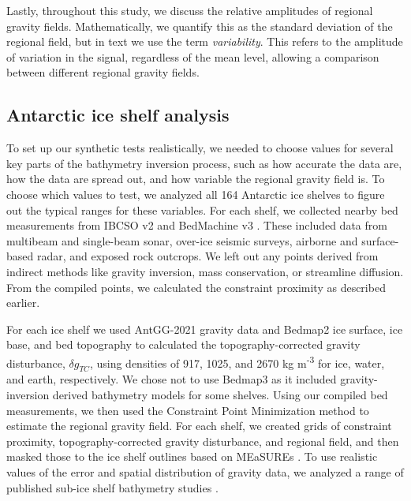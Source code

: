 \documentclass[tc, manuscript]{copernicus}
\begin{document}
Lastly, throughout this study, we discuss the relative amplitudes of regional gravity fields. Mathematically, we quantify this as the standard deviation of the regional field, but in text we use the term \textit{variability}. This refers to the amplitude of variation in the signal, regardless of the mean level, allowing a comparison between different regional gravity fields.

\subsection{Antarctic ice shelf analysis} \label{ice_shelf_analysis}

To set up our synthetic tests realistically, we needed to choose values for several key parts of the bathymetry inversion process, such as how accurate the data are, how the data are spread out, and how variable the regional gravity field is. To choose which values to test, we analyzed all 164 Antarctic ice shelves to figure out the typical ranges for these variables. For each shelf, we collected nearby bed measurements from IBCSO v2 \citep{dorschelinternational2022a} and BedMachine v3 \citep{morlighemmeasures2022}. These included data from multibeam and single-beam sonar, over-ice seismic surveys, airborne and surface-based radar, and exposed rock outcrops. We left out any points derived from indirect methods like gravity inversion, mass conservation, or streamline diffusion. From the compiled points, we calculated the constraint proximity as described earlier.

For each ice shelf we used AntGG-2021 gravity data \citep{scheinertantarctic2024} and Bedmap2 \citep{fretwellbedmap22013} ice surface, ice base, and bed topography to calculated the topography-corrected gravity disturbance, $\delta g_{TC}$, using densities of 917, 1025, and 2670 kg m\textsuperscript{-3} for ice, water, and earth, respectively. We chose not to use Bedmap3 \citep{pritchardbedmap32025} as it included gravity-inversion derived bathymetry models for some shelves. Using our compiled bed measurements, we then used the Constraint Point Minimization method to estimate the regional gravity field. For each shelf, we created grids of constraint proximity, topography-corrected gravity disturbance, and regional field, and then masked those to the ice shelf outlines based on MEaSUREs \citep{mouginotmeasures2017}. To use realistic values of the error and spatial distribution of gravity data, we analyzed a range of published sub-ice shelf bathymetry studies \citep{tintoross2019,yangbathymetry2021,eisermannbathymetric2021,constantinoseafloor2020,jordannew2020,eisermannbathymetry2020, eisermanncoastal2024, hodgsonfuture2019,weigetz2020,cochrandetailed2020, millanconstraining2020, birdgravityderived2025}.
\end{document}
